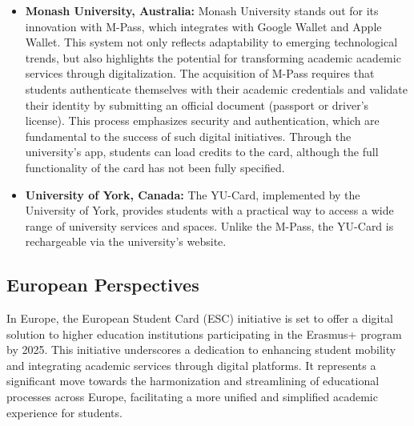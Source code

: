 \documentclass{article}
\begin{document}
\begin{itemize}
    \item \textbf{Monash University, Australia: }Monash University stands out for its
          innovation with M-Pass, which integrates with Google Wallet and Apple Wallet.
          This system not only reflects adaptability to emerging technological
          trends, but also highlights the potential for transforming academic
          academic services through digitalization. The acquisition of M-Pass requires
          that students authenticate themselves with their academic credentials and
          validate their identity by submitting an official document (passport or driver's license). This process emphasizes security and
          authentication, which are fundamental to the success of such digital initiatives.
          Through the university's app, students can load credits
          to the card, although the full functionality of the card has not been
          fully specified.
    \item \textbf{University of York, Canada: }The YU-Card, implemented by the University of
          York, provides students with a practical way to access a wide range of
          university services and spaces. Unlike the M-Pass,
          the YU-Card is rechargeable via the university's website.
\end{itemize}

\subsection{European Perspectives}
In Europe, the European Student Card (ESC) initiative is set to offer a digital solution to higher education institutions participating in the Erasmus+ program by 2025. This initiative underscores a dedication to enhancing student mobility and integrating academic services through digital platforms. It represents a significant move towards the harmonization and streamlining of educational processes across Europe, facilitating a more unified and simplified academic experience for students.
\end{document}
